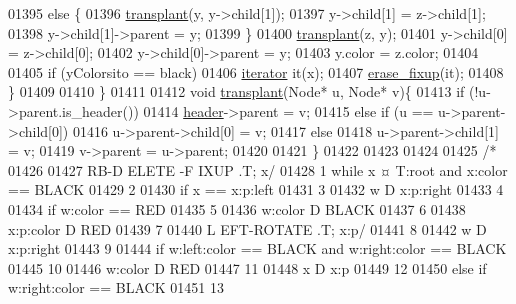 \begin{DoxyCode}
01395             \textcolor{keywordflow}{else} \{
01396                 \hyperlink{classaed2_1_1map_a98b9f200c64ce02dfb67902ee00e375a_a98b9f200c64ce02dfb67902ee00e375a}{transplant}(y, y->child[1]);
01397                 y->child[1] = z->child[1];
01398                 y->child[1]->parent = y;
01399             \}
01400             \hyperlink{classaed2_1_1map_a98b9f200c64ce02dfb67902ee00e375a_a98b9f200c64ce02dfb67902ee00e375a}{transplant}(z, y);
01401             y->child[0] = z->child[0];
01402             y->child[0]->parent = y;
01403             y.color = z.color;
01404 
01405             \textcolor{keywordflow}{if} (yColorsito == black)
01406                 \hyperlink{classaed2_1_1iterator}{iterator} it(x);
01407                 \hyperlink{classaed2_1_1map_a7870c8f26e82b00d0aeb2e9f331dfec6_a7870c8f26e82b00d0aeb2e9f331dfec6}{erase_fixup}(it);
01408         \}
01409 
01410 \}
01411 
01412     \textcolor{keywordtype}{void} \hyperlink{classaed2_1_1map_a98b9f200c64ce02dfb67902ee00e375a_a98b9f200c64ce02dfb67902ee00e375a}{transplant}(Node* u, Node* v)\{
01413         \textcolor{keywordflow}{if} (!u->parent.is\_header())
01414             \hyperlink{classaed2_1_1map_a92d93f905c8ad73fba18fdc7e8915cce_a92d93f905c8ad73fba18fdc7e8915cce}{header}->parent = v;
01415         \textcolor{keywordflow}{else} if (u == u->parent->child[0])
01416             u->parent->child[0] = v;
01417         \textcolor{keywordflow}{else}
01418             u->parent->child[1] = v;
01419         v->parent = u->parent;
01420 
01421     \}
01422 
01423 
01424 
01425 \textcolor{comment}{/*}
01426 \textcolor{comment}{}
01427 \textcolor{comment}{RB-D ELETE -F IXUP .T; x/}
01428 \textcolor{comment}{1 while x ¤ T:root and x:color == BLACK}
01429 \textcolor{comment}{2}
01430 \textcolor{comment}{if x == x:p:left}
01431 \textcolor{comment}{3}
01432 \textcolor{comment}{w D x:p:right}
01433 \textcolor{comment}{4}
01434 \textcolor{comment}{if w:color == RED}
01435 \textcolor{comment}{5}
01436 \textcolor{comment}{w:color D BLACK}
01437 \textcolor{comment}{6}
01438 \textcolor{comment}{x:p:color D RED}
01439 \textcolor{comment}{7}
01440 \textcolor{comment}{L EFT-ROTATE .T; x:p/}
01441 \textcolor{comment}{8}
01442 \textcolor{comment}{w D x:p:right}
01443 \textcolor{comment}{9}
01444 \textcolor{comment}{if w:left:color == BLACK and w:right:color == BLACK}
01445 \textcolor{comment}{10}
01446 \textcolor{comment}{w:color D RED}
01447 \textcolor{comment}{11}
01448 \textcolor{comment}{x D x:p}
01449 \textcolor{comment}{12}
01450 \textcolor{comment}{else if w:right:color == BLACK}
01451 \textcolor{comment}{13}

\end{DoxyCode}
